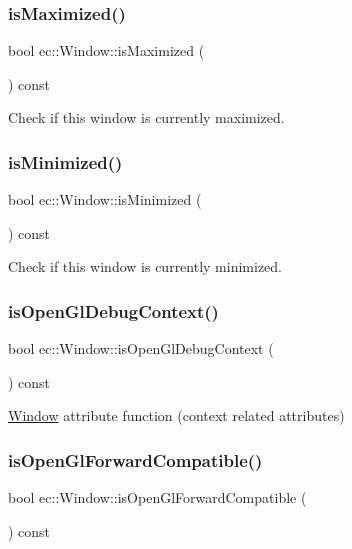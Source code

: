 \subsubsection{\texorpdfstring{is\+Maximized()}{isMaximized()}}
{\footnotesize\ttfamily bool ec\+::\+Window\+::is\+Maximized (\begin{DoxyParamCaption}{ }\end{DoxyParamCaption}) const}

Check if this window is currently maximized. \mbox{\label{classec_1_1_window_aa9de125288991354fdeb781e6d3f7a12}} 
\subsubsection{\texorpdfstring{is\+Minimized()}{isMinimized()}}
{\footnotesize\ttfamily bool ec\+::\+Window\+::is\+Minimized (\begin{DoxyParamCaption}{ }\end{DoxyParamCaption}) const}

Check if this window is currently minimized. \mbox{\label{classec_1_1_window_a00e2c10258dda2b7120c314c98be9268}} 
\subsubsection{\texorpdfstring{is\+Open\+Gl\+Debug\+Context()}{isOpenGlDebugContext()}}
{\footnotesize\ttfamily bool ec\+::\+Window\+::is\+Open\+Gl\+Debug\+Context (\begin{DoxyParamCaption}{ }\end{DoxyParamCaption}) const}

\mbox{\hyperlink{classec_1_1_window}{Window}} attribute function (context related attributes) \mbox{\label{classec_1_1_window_a4664b1d49a0eac0c879a9a24471347e5}} 
\subsubsection{\texorpdfstring{is\+Open\+Gl\+Forward\+Compatible()}{isOpenGlForwardCompatible()}}
{\footnotesize\ttfamily bool ec\+::\+Window\+::is\+Open\+Gl\+Forward\+Compatible (\begin{DoxyParamCaption}{ }\end{DoxyParamCaption}) const}

